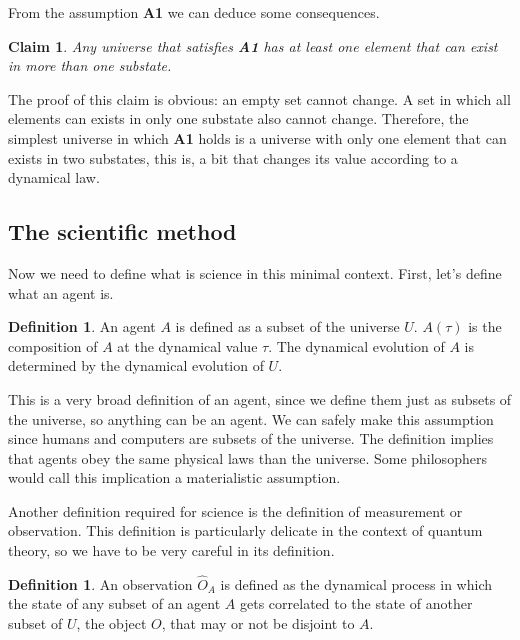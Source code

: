 \documentclass[11pt,a4paper,twoside]{report}
\newcommand{\+}{\textnormal{+} }
\newtheorem{myclaim}[mythm]{Claim}
\theoremstyle{definition}
\newtheorem{mydef}[mythm]{Definition}
\numberwithin{equation}{chapter}
\begin{document}
From the assumption \textbf{A1} we can deduce some consequences.
\begin{myclaim}
Any universe that satisfies \textbf{A1} has at least one element that can exist
in more than one substate.
\end{myclaim}

The proof of this claim is obvious: an empty set cannot change. A set in which 
all elements can exists in only one substate also cannot change. Therefore, 
the simplest universe in which \textbf{A1} holds is a universe with only one
element that can exists in two substates, this is, a bit that changes its value
according to a dynamical law.

\subsection{The scientific method}

Now we need to define what is science in this minimal context. First, let's 
define what an agent is.

\begin{mydef}
  An agent $A$ is defined as a subset of the universe $U$. $A(\tau)$ is the
  composition of $A$ at the dynamical value $\tau$. The dynamical evolution
  of $A$ is determined by the dynamical evolution of $U$.
\end{mydef}

This is a very broad definition of an agent, since we define them just as subsets
of the universe, so anything can be an agent. We can safely make this assumption 
since humans and computers are subsets of the universe. The definition implies 
that agents obey the same physical laws than the universe. Some philosophers 
would call this implication a materialistic assumption.

\par

Another definition required for science is the definition of measurement or 
observation. This definition is particularly delicate in the context of quantum
theory, so we have to be very careful in its definition. 

\begin{mydef}
  An observation $\hat{O}_A$ is defined as the dynamical process in which the 
  state of any subset of an agent $A$ gets correlated to the state of another
  subset of $U$, the object $O$, that may or not be disjoint to $A$.  
\end{mydef}
\end{document}
